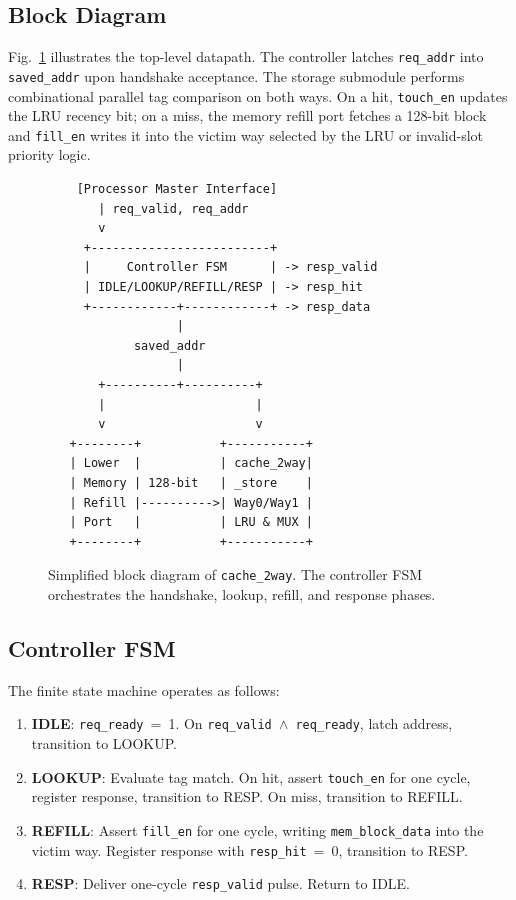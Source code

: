 \documentclass[conference]{IEEEtran}
\begin{document}
\subsection{Block Diagram}

Fig.~\ref{fig:block} illustrates the top-level datapath.  The controller
latches \texttt{req\_addr} into \texttt{saved\_addr} upon handshake
acceptance.  The storage submodule performs combinational parallel tag
comparison on both ways.  On a hit, \texttt{touch\_en} updates the LRU
recency bit; on a miss, the memory refill port fetches a 128-bit block
and \texttt{fill\_en} writes it into the victim way selected by the LRU
or invalid-slot priority logic.

\begin{figure}[ht]
\centering
\small
\begin{verbatim}
    [Processor Master Interface]
       | req_valid, req_addr
       v
     +-------------------------+
     |     Controller FSM      | -> resp_valid
     | IDLE/LOOKUP/REFILL/RESP | -> resp_hit
     +------------+------------+ -> resp_data
                  |
            saved_addr
                  |
       +----------+----------+
       |                     |
       v                     v
   +--------+           +-----------+
   | Lower  |           | cache_2way|
   | Memory | 128-bit   | _store    |
   | Refill |---------->| Way0/Way1 |
   | Port   |           | LRU & MUX |
   +--------+           +-----------+
\end{verbatim}
\caption{Simplified block diagram of \texttt{cache\_2way}.  The controller FSM orchestrates the handshake, lookup, refill, and response phases.}
\label{fig:block}
\end{figure}

\subsection{Controller FSM}

The finite state machine operates as follows:
\begin{enumerate}
  \item \textbf{IDLE}: \texttt{req\_ready}~=~1.  On \texttt{req\_valid $\land$ req\_ready}, latch address, transition to LOOKUP.
  \item \textbf{LOOKUP}: Evaluate tag match.  On hit, assert \texttt{touch\_en} for one cycle, register response, transition to RESP.  On miss, transition to REFILL.
  \item \textbf{REFILL}: Assert \texttt{fill\_en} for one cycle, writing \texttt{mem\_block\_data} into the victim way.  Register response with \texttt{resp\_hit}~=~0, transition to RESP.
  \item \textbf{RESP}: Deliver one-cycle \texttt{resp\_valid} pulse.  Return to IDLE.
\end{enumerate}
\end{document}
